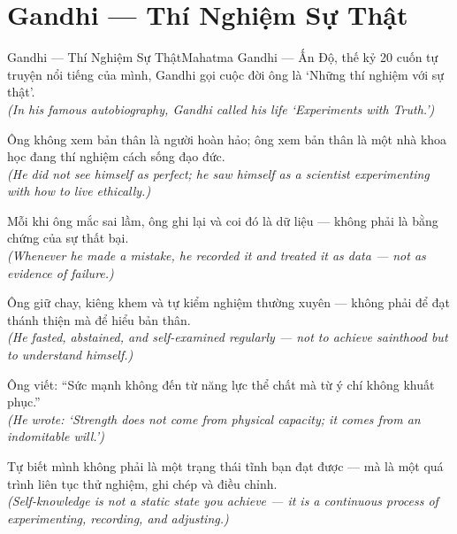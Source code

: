 \section{Gandhi --- Thí Nghiệm Sự Thật}
\begin{truyen}{Gandhi --- Thí Nghiệm Sự Thật}{Mahatma Gandhi --- Ấn Độ, thế kỷ 20}
 cuốn tự truyện nổi tiếng của mình, Gandhi gọi cuộc đời ông là `Những thí nghiệm với sự thật'.\\[4pt]
\textit{(In his famous autobiography, Gandhi called his life `Experiments with Truth.')}

Ông không xem bản thân là người hoàn hảo; ông xem bản thân là một nhà khoa học đang thí nghiệm cách sống đạo đức.\\[4pt]
\textit{(He did not see himself as perfect; he saw himself as a scientist experimenting with how to live ethically.)}

Mỗi khi ông mắc sai lầm, ông ghi lại và coi đó là dữ liệu --- không phải là bằng chứng của sự thất bại.\\[4pt]
\textit{(Whenever he made a mistake, he recorded it and treated it as data --- not as evidence of failure.)}

Ông giữ chay, kiêng khem và tự kiểm nghiệm thường xuyên --- không phải để đạt thánh thiện mà để hiểu bản thân.\\[4pt]
\textit{(He fasted, abstained, and self-examined regularly --- not to achieve sainthood but to understand himself.)}

Ông viết: ``Sức mạnh không đến từ năng lực thể chất mà từ ý chí không khuất phục.''\\[4pt]
\textit{(He wrote: `Strength does not come from physical capacity; it comes from an indomitable will.')}

\end{truyen}
\begin{baihoc}
  Tự biết mình không phải là một trạng thái tĩnh bạn đạt được --- mà là một quá trình liên tục thử nghiệm, ghi chép và điều chỉnh.\\[4pt]
  \textit{(Self-knowledge is not a static state you achieve --- it is a continuous process of experimenting, recording, and adjusting.)}
\end{baihoc}


